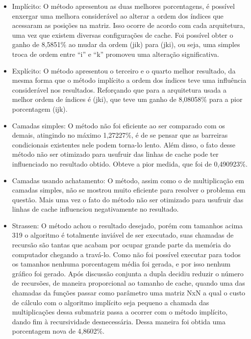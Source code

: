 \documentclass[a4paper, 10pt]{article}
\begin{document}
\begin{itemize}
\item Implícito: O método apresentou as duas melhores porcentagens, é possível enxergar uma melhora considerável ao alterar a ordem dos índices que acessaram as posições na matriz. Isso ocorre de acordo com cada arquitetura, uma vez que existem diversas configurações de cache. Foi possível obter o ganho de 8,5851\% ao mudar da ordem (jik) para (jki), ou seja, uma simples troca de ordem entre “i” e “k” promoveu uma alteração significativa.

\item Explícito: O método apresentou o terceiro e o quarto melhor resultado, da mesma forma que o método implícito a ordem dos índices teve uma influência considerável nos resultados. Reforçando que para a arquitetura usada a melhor ordem de índices é (jki), que teve um ganho de 8,08058\% para a pior porcentagem (ijk).

\item Camadas simples: O método não foi eficiente ao ser comparado com os demais, atingindo no máximo 1,27227\%, é de se pensar que as barreiras condicionais existentes nele podem torna-lo lento. Além disso, o fato desse método não ser otimizado para usufruir das linhas de cache pode ter influenciado no resultado obtido. Obteve a pior medida, que foi de 0,490923\%.

\item Camadas usando achatamento: O método, assim como o de multiplicação em camadas simples, não se mostrou muito eficiente para resolver o problema em questão. Mais uma vez o fato do método não ser otimizado para usufruir das linhas de cache influenciou negativamente no resultado.

\item Strassen: O método achou o resultado desejado, porém com tamanhos acima 319 o algoritmo é totalmente inviável de ser executado, suas chamadas de recursão são tantas que acabam por ocupar grande parte da memória do computador chegando a travá-lo. Como não foi possível executar para todos os tamanhos nenhuma porcentagem média foi gerada, e por isso nenhum gráfico foi gerado. Após discussão conjunta a dupla decidiu reduzir o número de recursões, de  maneira proporcional ao tamanho de cache, quando uma das chamadas da funções passar como parâmetro uma matriz NxN a qual o custo de cálculo com o algoritmo implícito seja pequeno a chamada das multiplicações dessa submatriz passa a ocorrer com o método implícito, dando fim à recursividade desnecessária. Dessa maneira foi obtida uma porcentagem nova de 4,8602\%.
\end{itemize}
\end{document}
